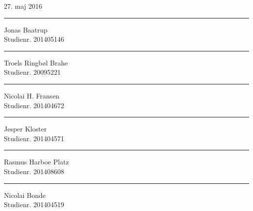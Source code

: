 \documentclass[11pt, a4paper, twoside, openany]{memoir}
\begin{document}
\begin{titlingpage}
\begin{center}
				27. maj 2016
				\vspace{10pt}
				\begin{figure}[H]
					\centering
				\end{figure}
				\vspace{50pt}
				\begin{minipage}{0.25\linewidth}
					\centering
					\hrule
					\vspace{12pt}
					Jonas Baatrup\\
					Studienr. 201405146
				\end{minipage}
				\hspace{10pt}
				\begin{minipage}{0.25\linewidth}
					\centering
					\hrule
					\vspace{12pt}
					Troels Ringbøl Brahe\\
					Studienr. 20095221
				\end{minipage}
				\hspace{10pt}
				\vspace{20pt}
				\begin{minipage}{0.25\linewidth}
					\centering
					\hrule
					\vspace{12pt}
					Nicolai H. Fransen\\
					Studienr. 201404672
				\end{minipage}
				\hspace{10pt}
				\begin{minipage}{0.25\linewidth}
					\centering
					\hrule
					\vspace{12pt}
					Jesper Kloster\\
					Studienr. 201404571
				\end{minipage}
				\hspace{10pt}
				\begin{minipage}{0.25\linewidth}
					\centering
					\hrule
					\vspace{12pt}
					Rasmus Harboe Platz\\
					Studienr. 201408608
				\end{minipage}
				\hspace{10pt}
				\vspace{20pt}
				\begin{minipage}{0.25\linewidth}
					\centering
					\hrule
					\vspace{12pt}
					Nicolai Bonde\\
					Studienr. 201404519
				\end{minipage}

\end{center}
\end{titlingpage}
\end{document}
